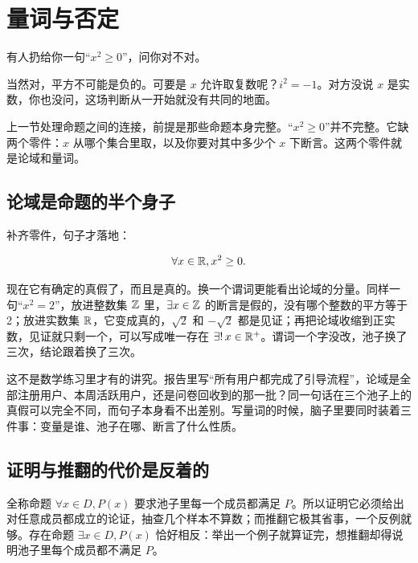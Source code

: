 \section{量词与否定}
\label{sec:01-Mathematical-Language/01-Logic/03}

有人扔给你一句``\(x^2\ge 0\)''，问你对不对。

当然对，平方不可能是负的。可要是 \(x\) 允许取复数呢？\(i^2=-1\)。对方没说 \(x\) 是实数，你也没问，这场判断从一开始就没有共同的地面。

上一节处理命题之间的连接，前提是那些命题本身完整。``\(x^2\ge 0\)''并不完整。它缺两个零件：\(x\) 从哪个集合里取，以及你要对其中多少个 \(x\) 下断言。这两个零件就是论域和量词。

\subsection{论域是命题的半个身子}

补齐零件，句子才落地：

\[
\forall x\in\mathbb{R},\space x^2\ge 0.
\]

现在它有确定的真假了，而且是真的。换一个谓词更能看出论域的分量。同样一句``\(x^2=2\)''，放进整数集 \(\mathbb{Z}\) 里，\(\exists x\in\mathbb{Z}\) 的断言是假的，没有哪个整数的平方等于 2；放进实数集 \(\mathbb{R}\)，它变成真的，\(\sqrt2\) 和 \(-\sqrt2\) 都是见证；再把论域收缩到正实数，见证就只剩一个，可以写成唯一存在 \(\exists!\,x\in\mathbb{R}^+\)。谓词一个字没改，池子换了三次，结论跟着换了三次。

这不是数学练习里才有的讲究。报告里写``所有用户都完成了引导流程''，论域是全部注册用户、本周活跃用户，还是问卷回收到的那一批？同一句话在三个池子上的真假可以完全不同，而句子本身看不出差别。写量词的时候，脑子里要同时装着三件事：变量是谁、池子在哪、断言了什么性质。

\subsection{证明与推翻的代价是反着的}

全称命题 \(\forall x\in D,P(x)\) 要求池子里每一个成员都满足 \(P\)。所以证明它必须给出对任意成员都成立的论证，抽查几个样本不算数；而推翻它极其省事，一个反例就够。存在命题 \(\exists x\in D,P(x)\) 恰好相反：举出一个例子就算证完，想推翻却得说明池子里每个成员都不满足 \(P\)。

